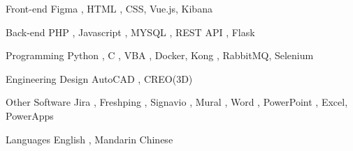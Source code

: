 

\begin{cvskills}

  \cvskill
    {Front-end} %
    {Figma , HTML , CSS, Vue.js, Kibana} %

  \cvskill
    {Back-end} %
    {PHP , Javascript , MYSQL , REST API , Flask} %

  \cvskill
    {Programming} %
    {Python , C , VBA , Docker, Kong , RabbitMQ, Selenium} %
    
  \cvskill
    {Engineering Design} %
    {AutoCAD , CREO(3D)} %

  \cvskill
    {Other Software} %
    {Jira , Freshping , Signavio , Mural , Word , PowerPoint , Excel, PowerApps} %

  \cvskill
    {Languages} %
    {English , Mandarin Chinese} %

\end{cvskills}
